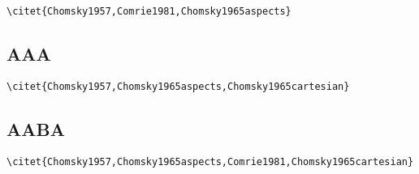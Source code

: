         \citet{Chomsky1957}            


\bigskip
\verb+\citet{Chomsky1957,Comrie1981,Chomsky1965aspects}+

       \citet{Chomsky1957,Comrie1981,Chomsky1965aspects} 

 
 
\subsection{AAA} 

\bigskip
\verb+\citet{Chomsky1957,Chomsky1965aspects,Chomsky1965cartesian}+

       \citet{Chomsky1957,Chomsky1965aspects,Chomsky1965cartesian} 
 
\subsection{AABA} 
\bigskip
\verb+\citet{Chomsky1957,Chomsky1965aspects,Comrie1981,Chomsky1965cartesian}+

       \citet{Chomsky1957,Chomsky1965aspects,Comrie1981,Chomsky1965cartesian} 

 
 
